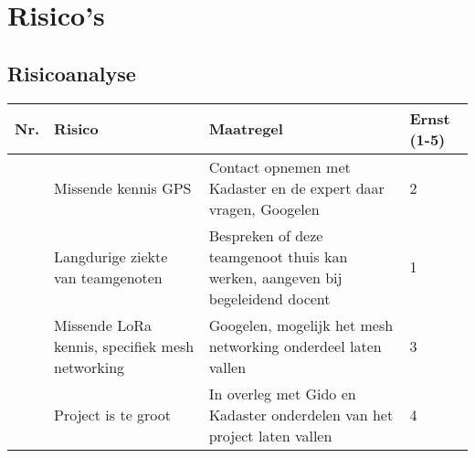 \newcommand{\printrisk}{\arabic{risk}\stepcounter{risk}}
\section{Risico's}
\subsection{Risicoanalyse}

\begin{tabularx}{\textwidth}{| p{1.1cm} | X | X | p{1.1cm} |}
    \hline
    \textbf{Nr.} & \textbf{Risico} & \textbf{Maatregel} & \textbf{Ernst (1-5)}
    \\ \hline

    \printrisk & Missende kennis GPS
               & Contact opnemen met Kadaster en de expert daar vragen, Googelen
               & 2\\ \hline

    \printrisk & Langdurige ziekte van teamgenoten
               & Bespreken of deze teamgenoot thuis kan werken,
                 aangeven bij begeleidend docent
               & 1\\ \hline

    \printrisk & Missende LoRa kennis, specifiek mesh networking
               & Googelen, mogelijk het mesh networking onderdeel laten vallen
               & 3\\ \hline

    \printrisk & Project is te groot
               & In overleg met Gido en Kadaster onderdelen van het project
                 laten vallen
               & 4\\ \hline
\end{tabularx}
